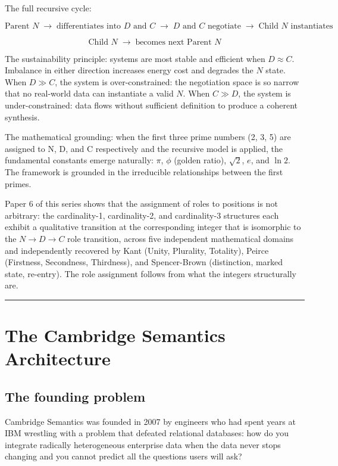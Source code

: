 \documentclass[12pt]{article}
\begin{document}
The full recursive cycle:

\[\text{Parent } N \;\to\; \text{differentiates into } D \text{ and } C \;\to\; D \text{ and } C \text{ negotiate} \;\to\; \text{Child } N \text{ instantiates}\]

\[\text{Child } N \;\to\; \text{becomes next Parent } N\]

The sustainability principle: systems are most stable and efficient when
\(D \approx C\). Imbalance in either direction increases energy cost and
degrades the \(N\) state. When \(D \gg C\), the system is
over-constrained: the negotiation space is so narrow that no real-world
data can instantiate a valid \(N\). When \(C \gg D\), the system is
under-constrained: data flows without sufficient definition to produce a
coherent synthesis.

The mathematical grounding: when the first three prime numbers (2, 3, 5)
are assigned to N, D, and C respectively and the recursive model is
applied, the fundamental constants emerge naturally: \(\pi\), \(\phi\)
(golden ratio), \(\sqrt{2}\), \(e\), and \(\ln 2\). The framework is
grounded in the irreducible relationships between the first primes.

Paper 6 of this series shows that the assignment of roles to positions
is not arbitrary: the cardinality-1, cardinality-2, and cardinality-3
structures each exhibit a qualitative transition at the corresponding
integer that is isomorphic to the \(N \to D \to C\) role transition,
across five independent mathematical domains and independently recovered
by Kant (Unity, Plurality, Totality), Peirce (Firstness, Secondness,
Thirdness), and Spencer-Brown (distinction, marked state, re-entry). The
role assignment follows from what the integers structurally are.

\begin{center}\rule{0.5\linewidth}{0.5pt}\end{center}

\section{The Cambridge Semantics Architecture}\label{the-cambridge-semantics-architecture}

\subsection{The founding problem}\label{the-founding-problem}

Cambridge Semantics was founded in 2007 by engineers who had spent years
at IBM wrestling with a problem that defeated relational databases: how
do you integrate radically heterogeneous enterprise data when the data
never stops changing and you cannot predict all the questions users will
ask?
\end{document}
